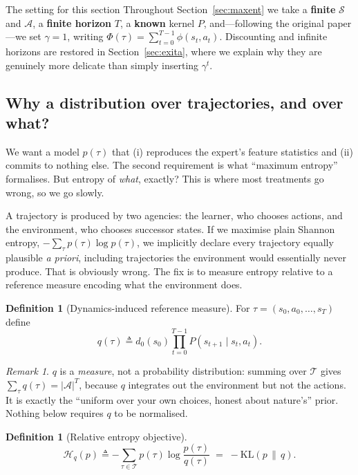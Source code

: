 \documentclass[11pt]{article}
\theoremstyle{plain}
\theoremstyle{definition}
\newtheorem{definition}[theorem]{Definition}
\theoremstyle{remark}
\newtheorem{remark}[theorem]{Remark}
\renewcommand{\S}{\mathcal{S}}
\newcommand{\A}{\mathcal{A}}
\newcommand{\T}{\mathcal{T}}
\newcommand{\KL}{\mathrm{KL}}
\begin{document}
\begin{graybox}{The setting for this section}
Throughout Section~\ref{sec:maxent} we take a \textbf{finite} $\S$ and
$\A$, a \textbf{finite horizon} $T$, a \textbf{known} kernel $P$, and---following
the original paper---we set $\gamma=1$, writing $\Phi(\tau) =
\sum_{t=0}^{T-1}\phi(s_t,a_t)$. Discounting and infinite horizons are
restored in Section~\ref{sec:exita}, where we explain why they are
genuinely more delicate than simply inserting $\gamma^t$.
\end{graybox}

\subsection{Why a distribution over trajectories, and over what?}

We want a model $p(\tau)$ that (i) reproduces the expert's feature
statistics and (ii) commits to nothing else. The second requirement is
what ``maximum entropy'' formalises. But entropy of \emph{what}, exactly?
This is where most treatments go wrong, so we go slowly.

A trajectory is produced by two agencies: the learner, who chooses
actions, and the environment, who chooses successor states. If we maximise
plain Shannon entropy, $-\sum_\tau p(\tau)\log p(\tau)$, we implicitly
declare every trajectory equally plausible \emph{a priori}, including
trajectories the environment would essentially never produce. That is
obviously wrong. The fix is to measure entropy relative to a reference
measure encoding what the environment does.

\begin{definition}[Dynamics-induced reference measure]\label{def:refmeasure}
For $\tau = (s_0,a_0,\ldots,s_T)$ define
\begin{equation}
q(\tau) \triangleq d_0(s_0) \prod_{t=0}^{T-1} P(s_{t+1}\mid s_t,a_t).
\label{eq:refmeasure}
\end{equation}
\end{definition}

\begin{remark}
$q$ is a \emph{measure}, not a probability distribution: summing over
$\T$ gives $\sum_\tau q(\tau) = |\A|^T$, because $q$ integrates out the
environment but not the actions. It is exactly the ``uniform over your own
choices, honest about nature's'' prior. Nothing below requires $q$ to be
normalised.
\end{remark}

\begin{definition}[Relative entropy objective]
\begin{equation}
\mathcal{H}_q(p) \triangleq -\sum_{\tau\in\T} p(\tau)\log\frac{p(\tau)}{q(\tau)}
\;=\; -\KL(p\,\|\,q).
\label{eq:relentropy}
\end{equation}
\end{definition}
\end{document}
